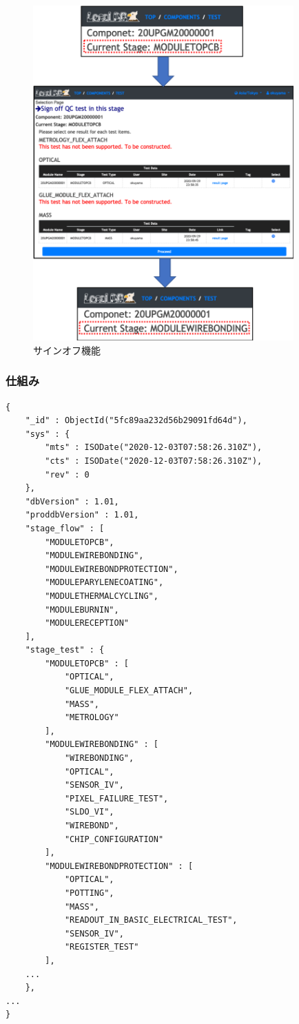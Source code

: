 \begin{figure}[bpt]\centering
\includegraphics[width=10cm]{webapp_sign_off}
\caption[サインオフ機能]{サインオフ機能}
\label{webapp_sign_off}
\end{figure}

\newpage
\subsubsection{仕組み}
\begin{lstlisting}[caption=hoge,label=fuga]
{
	"_id" : ObjectId("5fc89aa232d56b29091fd64d"),
	"sys" : {
		"mts" : ISODate("2020-12-03T07:58:26.310Z"),
		"cts" : ISODate("2020-12-03T07:58:26.310Z"),
		"rev" : 0
	},
	"dbVersion" : 1.01,
	"proddbVersion" : 1.01,
	"stage_flow" : [
		"MODULETOPCB",
		"MODULEWIREBONDING",
		"MODULEWIREBONDPROTECTION",
		"MODULEPARYLENECOATING",
		"MODULETHERMALCYCLING",
		"MODULEBURNIN",
		"MODULERECEPTION"
	],
	"stage_test" : {
		"MODULETOPCB" : [
			"OPTICAL",
			"GLUE_MODULE_FLEX_ATTACH",
			"MASS",
			"METROLOGY"
		],
		"MODULEWIREBONDING" : [
			"WIREBONDING",
			"OPTICAL",
			"SENSOR_IV",
			"PIXEL_FAILURE_TEST",
			"SLDO_VI",
			"WIREBOND",
			"CHIP_CONFIGURATION"
		],
		"MODULEWIREBONDPROTECTION" : [
			"OPTICAL",
			"POTTING",
			"MASS",
			"READOUT_IN_BASIC_ELECTRICAL_TEST",
			"SENSOR_IV",
			"REGISTER_TEST"
		],
    ...
	},
...
}
\end{lstlisting}

